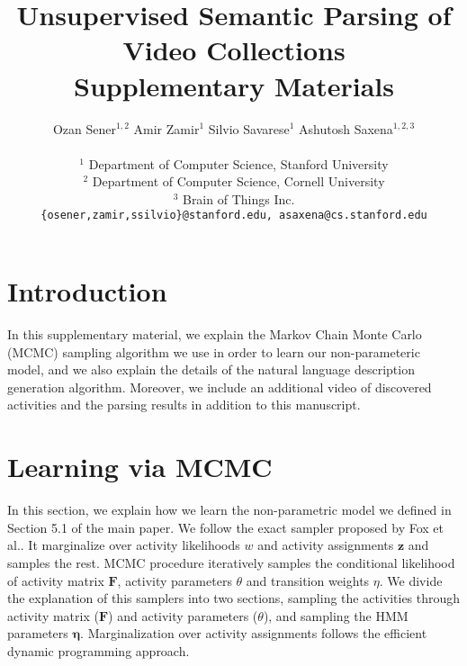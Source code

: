 \documentclass[10pt,twocolumn,letterpaper]{article}
\begin{document}
\title{Unsupervised Semantic Parsing of Video Collections \\ Supplementary Materials}

\author{ Ozan Sener$^{1,2}$ \;\; Amir Zamir$^{1}$ \;\; Silvio Savarese$^{1}$ \;\; Ashutosh Saxena$^{1,2,3}$  \\ \\
$^1$ Department of Computer Science, Stanford University\\
$^2$ Department of Computer Science, Cornell University\\
$^3$ Brain of Things Inc.\\
{\tt\small \{osener,zamir,ssilvio\}@stanford.edu, asaxena@cs.stanford.edu}
}

\maketitle

\section{Introduction}
In this supplementary material, we explain the Markov Chain Monte Carlo (MCMC) sampling algorithm we use in order to learn our non-parameteric model, and we also explain the details of the natural language description generation algorithm. Moreover, we include an additional video of discovered activities and the parsing results in addition to this manuscript.

\section{Learning via MCMC}
In this section, we explain how we learn the non-parametric model we defined in Section 5.1 of the main paper. We follow the exact sampler proposed by Fox et al.\cite{foxBPHMM}. It marginalize over activity likelihoods $w$ and activity assignments $\mathbf{z}$ and samples the rest. MCMC procedure iteratively samples the conditional likelihood of activity matrix $\mathbf{F}$, activity parameters $\theta$ and transition weights $\eta$. We divide the explanation of this samplers into two sections, sampling the activities through activity matrix ($\mathbf{F}$) and activity parameters ($\theta$), and sampling the HMM parameters $\mathbf{\eta}$. Marginalization over activity assignments follows the efficient dynamic programming approach.
\end{document}
